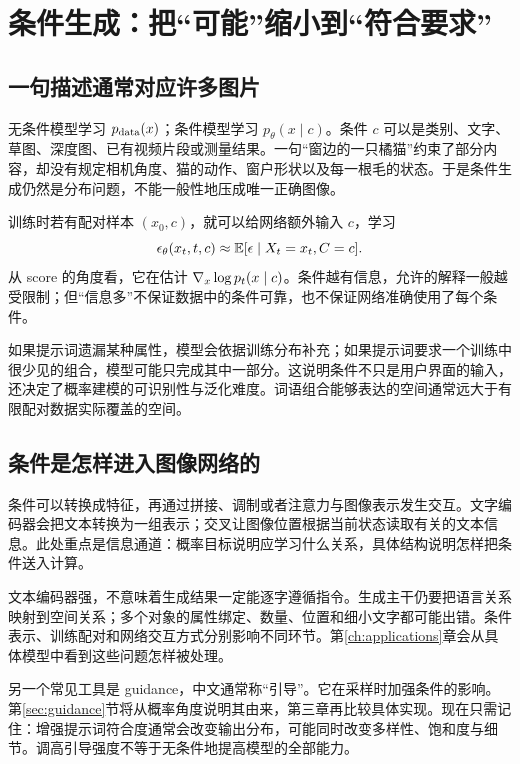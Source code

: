 \section{条件生成：把“可能”缩小到“符合要求”}
\label{sec:c-conditional}

\subsection{一句描述通常对应许多图片}

无条件模型学习 $p_{\mathrm{data}}(x)$；条件模型学习 $p_\theta(x\mid c)$。条件 $c$ 可以是类别、文字、草图、深度图、已有视频片段或测量结果。一句“窗边的一只橘猫”约束了部分内容，却没有规定相机角度、猫的动作、窗户形状以及每一根毛的状态。于是条件生成仍然是分布问题，不能一般性地压成唯一正确图像。

训练时若有配对样本 $(x_0,c)$，就可以给网络额外输入 $c$，学习
\[
 \epsilon_\theta(x_t,t,c)\approx \mathbb{E}[\epsilon\mid X_t=x_t,C=c].
\]
从 score 的角度看，它在估计 $\nabla_x\log p_t(x\mid c)$。条件越有信息，允许的解释一般越受限制；但“信息多”不保证数据中的条件可靠，也不保证网络准确使用了每个条件。

如果提示词遗漏某种属性，模型会依据训练分布补充；如果提示词要求一个训练中很少见的组合，模型可能只完成其中一部分。这说明条件不只是用户界面的输入，还决定了概率建模的可识别性与泛化难度。词语组合能够表达的空间通常远大于有限配对数据实际覆盖的空间。

\subsection{条件是怎样进入图像网络的}

条件可以转换成特征，再通过拼接、调制或者注意力与图像表示发生交互。文字编码器会把文本转换为一组表示；交叉让图像位置根据当前状态读取有关的文本信息。此处重点是信息通道：概率目标说明应学习什么关系，具体结构说明怎样把条件送入计算。

文本编码器强，不意味着生成结果一定能逐字遵循指令。生成主干仍要把语言关系映射到空间关系；多个对象的属性绑定、数量、位置和细小文字都可能出错。条件表示、训练配对和网络交互方式分别影响不同环节。第\ref{ch:applications}章会从具体模型中看到这些问题怎样被处理。

另一个常见工具是 guidance，中文通常称“引导”。它在采样时加强条件的影响。第\ref{sec:guidance}节将从概率角度说明其由来，第三章再比较具体实现。现在只需记住：增强提示词符合度通常会改变输出分布，可能同时改变多样性、饱和度与细节。调高引导强度不等于无条件地提高模型的全部能力。

